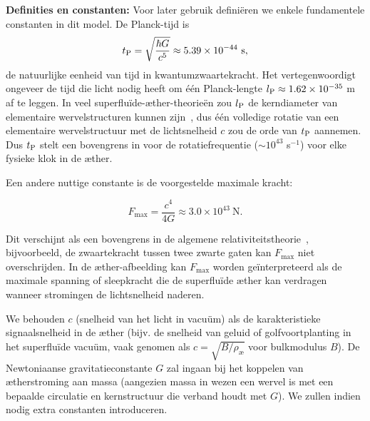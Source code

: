 \textbf{Definities en constanten:} Voor later gebruik definiëren we enkele fundamentele constanten in dit model. De Planck-tijd is
\[
    t_{\textrm P} = \sqrt{\frac{\hbar G}{c^5}} \approx 5.39\times10^{-44}\ \text{s},
\]
de natuurlijke eenheid van tijd in kwantumzwaartekracht. Het vertegenwoordigt ongeveer de tijd die licht nodig heeft om één Planck-lengte $l_{\textrm P} \approx 1.62\times10^{-35}$ m af te leggen. In veel superfluïde-æther-theorieën zou $l_{\textrm P}$ de kerndiameter van elementaire wervelstructuren kunnen zijn~\cite{Winterberg2002-PlanckAether}, dus één volledige rotatie van een elementaire wervelstructuur met de lichtsnelheid $c$ zou de orde van $t_{\textrm P}$ aannemen. Dus $t_{\textrm P}$ stelt een bovengrens in voor de rotatiefrequentie ($\sim 10^{43}$ s$^{-1}$) voor elke fysieke klok in de æther.

Een andere nuttige constante is de voorgestelde maximale kracht:

\begin{equation*}
    F_\text{max} = \frac{c^4}{4G} \approx 3.0\times10^{43}\ \text{N}.
\end{equation*}

Dit verschijnt als een bovengrens in de algemene relativiteitstheorie~\cite{Schiller2022-maxforce}, bijvoorbeeld, de zwaartekracht tussen twee zwarte gaten kan $F_\text{max}$ niet overschrijden. In de æther-afbeelding kan $F_\text{max}$ worden geïnterpreteerd als de maximale spanning of sleepkracht die de superfluïde æther kan verdragen wanneer stromingen de lichtsnelheid naderen.

We behouden $c$ (snelheid van het licht in vacuüm) als de karakteristieke signaalsnelheid in de æther (bijv. de snelheid van geluid of golfvoortplanting in het superfluïde vacuüm, vaak genomen als $c = \sqrt{B/\rho_{\text{\ae}}}$ voor bulkmodulus $B$). De Newtoniaanse gravitatieconstante $G$ zal ingaan bij het koppelen van ætherstroming aan massa (aangezien massa in wezen een wervel is met een bepaalde circulatie en kernstructuur die verband houdt met $G$). We zullen indien nodig extra constanten introduceren.